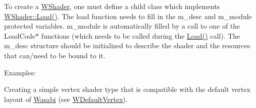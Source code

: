 To create a \hyperlink{class_w_shader}{W\+Shader}, one must define a child class which implements \hyperlink{class_w_shader_a7ce478193bc1676b1a7fdd741bdb32aa}{W\+Shader\+::\+Load()}. The load function needs to fill in the m\+\_\+desc and m\+\_\+module protected variables. m\+\_\+module is automatically filled by a call to one of the Load\+Code$\ast$ functions (which needs to be called during the \hyperlink{class_w_shader_a7ce478193bc1676b1a7fdd741bdb32aa}{Load()} call). The m\+\_\+desc structure should be initialized to describe the shader and the resources that can/need to be bound to it.

Examples\+:

Creating a simple vertex shader type that is compatible with the default vertex layout of \hyperlink{class_wasabi}{Wasabi} (see \hyperlink{struct_w_default_vertex}{W\+Default\+Vertex}). 
